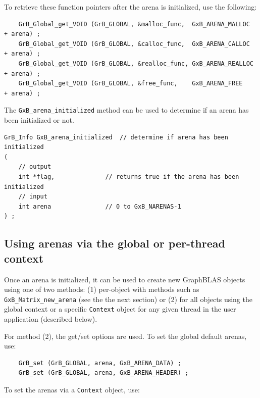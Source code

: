 To retrieve these function pointers after the arena is initialized, use the following:

    {\footnotesize
    \begin{verbatim}
    GrB_Global_get_VOID (GrB_GLOBAL, &malloc_func,  GxB_ARENA_MALLOC  + arena) ;
    GrB_Global_get_VOID (GrB_GLOBAL, &calloc_func,  GxB_ARENA_CALLOC  + arena) ;
    GrB_Global_get_VOID (GrB_GLOBAL, &realloc_func, GxB_ARENA_REALLOC + arena) ;
    GrB_Global_get_VOID (GrB_GLOBAL, &free_func,    GxB_ARENA_FREE    + arena) ; \end{verbatim}}

The \verb'GxB_arena_initialized' method can be used to determine if an
arena has been initialized or not.

\begin{mdframed}[userdefinedwidth=6in]
{\footnotesize
\begin{verbatim}
GrB_Info GxB_arena_initialized  // determine if arena has been initialized
(
    // output
    int *flag,              // returns true if the arena has been initialized
    // input
    int arena               // 0 to GxB_NARENAS-1
) ;
\end{verbatim}
}\end{mdframed}

\subsection{Using arenas via the global or per-thread context}
\label{arena_global}

Once an arena is initialized, it can be used to create new GraphBLAS objects
using one of two methods:  (1) per-object with methods such as
\verb'GxB_Matrix_new_arena' (see the the next section) or (2) for all objects
using the global context or a specific \verb'Context' object for any given
thread in the user application (described below). 

For method (2), the get/set options are used.  To set the global default
arenas, use:

    {\footnotesize
    \begin{verbatim}
    GrB_set (GrB_GLOBAL, arena, GxB_ARENA_DATA) ;
    GrB_set (GrB_GLOBAL, arena, GxB_ARENA_HEADER) ; \end{verbatim}}

To set the arenas via a \verb'Context' object, use:

